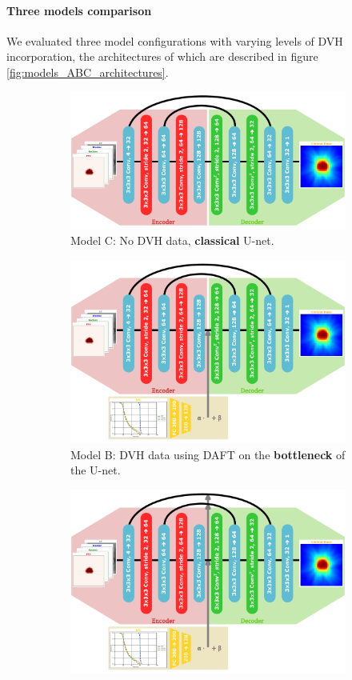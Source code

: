 \paragraph{Three models comparison}
We evaluated three model configurations with varying levels of DVH incorporation, the architectures of which are described in figure \ref{fig:models_ABC_architectures}.

\begin{figure}
	\centering
	\begin{subfigure}{\linewidth}
		\centering
		\includegraphics[width=11.5cm]{SFPM/modelC.pdf}
		\caption{Model C: No DVH data, \textbf{classical} U-net.}
		\label{fig:model_C_architecture}
	\end{subfigure}
	\begin{subfigure}{\linewidth}
		\centering
		\includegraphics[width=11.5cm]{SFPM/modelB.pdf}
		\caption{Model B: DVH data using DAFT on the \textbf{bottleneck} of the U-net.}
		\label{fig:model_B_architecture}
	\end{subfigure}
	\begin{subfigure}{\linewidth}
		\centering
		\includegraphics[width=11.5cm]{SFPM/modelA.pdf}

\end{subfigure}
\end{figure}
